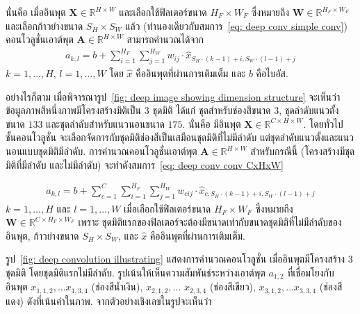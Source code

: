 นั่นคือ
เมื่ออินพุต $\bm{X} \in \mathbb{R}^{H \times W}$ 
และเลือกใช้ฟิลเตอร์ขนาด $H_F \times W_F$ ซึ่งหมายถึง 
$\bm{W}  \in \mathbb{R}^{H_F \times W_F}$
และเลือกก้าวย่างขนาด $S_H \times S_W$ 
แล้ว
(ทำนองเดียวกับสมการ~\ref{eq: deep conv simple conv}) คอนโวลูชั่นเอาต์พุต $\bm{A} \in \mathbb{R}^{H \times W}$ สามารถคำนวณได้จาก
\begin{eqnarray}
a_{k,l} = b + \sum_{i=1}^{H_F} \sum_{j=1}^{H_W} w_{ij} \cdot \hat{x}_{S_H \cdot (k-1)+i, S_W \cdot (l-1)+j} 
\label{eq: deep conv conv HxW}
\end{eqnarray}
$k = 1, \ldots, H$,
$l = 1, \ldots, W$
โดย 
$\hat{x}$ คืออินพุตที่ผ่านการเติมเต็ม
และ $b$ คือไบอัส.

อย่างไรก็ตาม เมื่อพิจารณารูป~\ref{fig: deep image showing dimension structure} 
จะเห็นว่า
ข้อมูลภาพสีหนึ่งภาพมีโครงสร้างมิติเป็น $3$ ชุดมิติ ได้แก่ ชุดสำหรับช่องสีขนาด $3$, ชุดลำดับแนวตั้งขนาด $133$ และชุดลำดับสำหรับแนวนอนขนาด $175$.
นั่นคือ มีอินพุต $\bm{X} \in \mathbb{R}^{C \times H \times W}$.
โดยทั่วไป ชั้นคอนโวลูชั่น จะเลือกจัดการกับชุดมิติช่องสีเป็นเสมือนชุดมิติที่ไม่มีลำดับ แต่ชุดลำดับแนวตั้งและแนวนอนแบบชุดมิติมีลำดับ.
การคำนวณคอนโวลูชั่นเอาต์พุต $\bm{A} \in \mathbb{R}^{H \times W}$
สำหรับกรณีนี้ (โครงสร้างมีชุดมิติที่มีลำดับ และไม่มีลำดับ)
จะทำดังสมการ~\ref{eq: deep conv conv CxHxW}

\begin{eqnarray}
a_{k,l} = b + \sum_{c=1}^C \sum_{i=1}^{H_F} \sum_{j=1}^{H_W} w_{cij} \cdot \hat{x}_{c, S_H \cdot (k-1)+i, S_W \cdot (l-1)+j} 
\label{eq: deep conv conv CxHxW}
\end{eqnarray}
$k = 1, \ldots, H$ และ
$l = 1, \ldots, W$
เมื่อเลือกใช้ฟิลเตอร์ขนาด $H_F \times W_F$ ซึ่งหมายถึง 
$\bm{W}  \in \mathbb{R}^{C \times H_F \times W_F}$
เพราะ ชุดมิติแรกของฟิลเตอร์จะต้องมีขนาดเท่ากับขนาดชุดมิติที่ไม่มีลำดับของอินพุต,
ก้าวย่างขนาด $S_H \times S_W$,
และ
$\hat{x}$ คืออินพุตที่ผ่านการเติมเต็ม.

รูป~\ref{fig: deep convolution illustrating} แสดงการคำนวณคอนโวลูชั่น เมื่ออินพุตมีโครงสร้าง $3$ ชุดมิติ โดยชุดมิติแรกไม่มีลำดับ.
รูปเน้นให้เห็นความสัมพันธ์ระหว่างเอาต์พุต $a_{1,2}$ ที่เชื่อมโยงกับ
อินพุต $x_{1,1,2}, \ldots x_{1,3,4}$ (ช่องสีน้ำเงิน), 
$x_{2,1,2}, \ldots$ $x_{2,3,4}$ (ช่องสีเขียว), 
$x_{3,1,2}, \ldots x_{3,3,4}$ (ช่องสีแดง)
ดังที่เน้นคำในภาพ.
จากตัวอย่างเชิงเลขในรูปจะเห็นว่า

